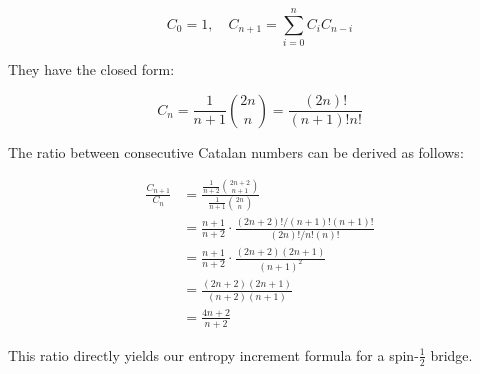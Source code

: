 \documentclass[11pt, a4paper]{article}
\theoremstyle{plain}
\theoremstyle{definition}
\theoremstyle{remark}
\begin{document}
\begin{equation}
C_0 = 1, \quad C_{n+1} = \sum_{i=0}^{n} C_i C_{n-i}
\end{equation}

They have the closed form:

\begin{equation}
C_n = \frac{1}{n+1}\binom{2n}{n} = \frac{(2n)!}{(n+1)!n!}
\end{equation}

The ratio between consecutive Catalan numbers can be derived as follows:

\begin{align}
\frac{C_{n+1}}{C_n} &= \frac{\frac{1}{n+2}\binom{2n+2}{n+1}}{\frac{1}{n+1}\binom{2n}{n}} \\
&= \frac{n+1}{n+2} \cdot \frac{(2n+2)!/(n+1)!(n+1)!}{(2n)!/n!(n)!} \\
&= \frac{n+1}{n+2} \cdot \frac{(2n+2)(2n+1)}{(n+1)^2} \\
&= \frac{(2n+2)(2n+1)}{(n+2)(n+1)} \\
&= \frac{4n+2}{n+2}
\end{align}

This ratio directly yields our entropy increment formula for a spin-$\frac{1}{2}$ bridge.
\end{document}
